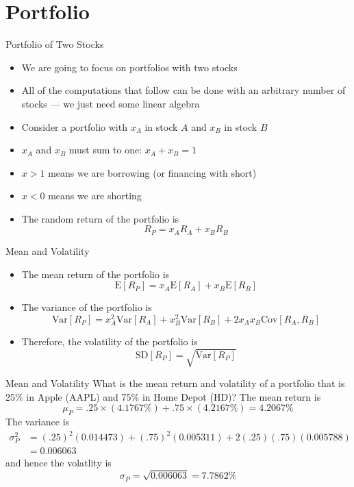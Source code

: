 \documentclass{beamer}
\begin{document}
\section{Portfolio}
\begin{frame}{Portfolio of Two Stocks}
	\begin{itemize}
		\item We are going to focus on portfolios with two stocks
		\item All of the computations that follow can be done with an arbitrary number of stocks --- we just need some linear algebra 	
		\item Consider a portfolio with $x_{A}$ in stock $A$ and $x_{B}$ in stock $B$
		\item $x_{A}$ and $x_{B}$ must sum to one: $x_{A}+x_{B}=1$
		\item $x>1$ means we are borrowing (or financing with short)
		\item $x<0$ means we are shorting
		\item The random return of the portfolio is
		\begin{equation*}
			R_{P}=x_{A}R_{A}+x_{B}R_{B}
		\end{equation*}
	\end{itemize}
\end{frame}

\begin{frame}{Mean and Volatility}
	\begin{itemize}
		\item The mean return of the portfolio is
		\begin{equation*}
			\text{E}[R_{P}]=x_{A}\text{E}[R_{A}]+x_{B}\text{E}[R_{B}]
		\end{equation*}
		\item The variance of the portfolio is
		\begin{equation*}
			\text{Var}[R_{P}]=x_{A}^{2}\text{Var}[R_{A}]+x_{B}^{2}\text{Var}[R_{B}]+2x_{A}x_{B}\text{Cov}[R_{A},R_{B}]
		\end{equation*}
		\item Therefore, the volatility of the portfolio is
		\begin{equation*}
			\text{SD}[R_{P}]=\sqrt{\text{Var}[R_{P}]}
		\end{equation*}
	\end{itemize}
\end{frame}
\begin{frame}{Mean and Volatility}
	What is the mean return and volatility of a portfolio that is 25\% in Apple (AAPL) and 75\% in Home Depot (HD)?
	\pause
	{\color{blue}
	The mean return is
	\begin{equation*}
		\mu_{P}=.25\times(4.1767\%)+.75\times(4.2167\%)=4.2067\%
	\end{equation*}
	}
	{\color{blue}
	The variance is
	\begin{align*}
		\sigma_{P}^{2}&=(.25)^2(0.014473)+(.75)^2(0.005311)+2(.25)(.75)(0.005788)\\
		&=0.006063
	\end{align*}
	and hence the volatlity is
	\begin{equation}
		\sigma_{P}=\sqrt{0.006063}=7.7862\%
	\end{equation}
	}
\end{frame}
\end{document}
